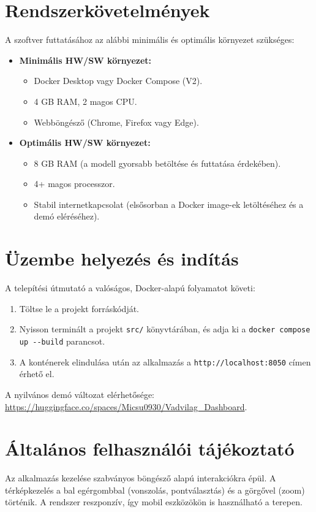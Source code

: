 \documentclass[
	parspace, %
]{elteikthesis}[2024/04/26]
\begin{document}
\section{Rendszerkövetelmények}
A szoftver futtatásához az alábbi minimális és optimális környezet szükséges:
\begin{itemize}
    \item \textbf{Minimális HW/SW környezet:}
    \begin{itemize}
        \item Docker Desktop vagy Docker Compose (V2).
        \item 4 GB RAM, 2 magos CPU.
        \item Webböngésző (Chrome, Firefox vagy Edge).
    \end{itemize}
    \item \textbf{Optimális HW/SW környezet:}
    \begin{itemize}
        \item 8 GB RAM (a modell gyorsabb betöltése és futtatása érdekében).
        \item 4+ magos processzor.
        \item Stabil internetkapcsolat (elsősorban a Docker image-ek letöltéséhez és a demó eléréséhez).
    \end{itemize}
\end{itemize}

\section{Üzembe helyezés és indítás}
A telepítési útmutató a valóságos, Docker-alapú folyamatot követi:
\begin{enumerate}
    \item Töltse le a projekt forráskódját.
    \item Nyisson terminált a projekt \texttt{src/} könyvtárában, és adja ki a \texttt{docker compose up -{}-build} parancsot.
    \item A konténerek elindulása után az alkalmazás a \texttt{http://localhost:8050} címen érhető el.
\end{enumerate}
A nyilvános demó változat elérhetősége: \url{https://huggingface.co/spaces/Micsu0930/Vadvilag_Dashboard}.

\section{Általános felhasználói tájékoztató}
Az alkalmazás kezelése szabványos böngésző alapú interakciókra épül. A térképkezelés a bal egérgombbal (vonszolás, pontválasztás) és a görgővel (zoom) történik. A rendszer reszponzív, így mobil eszközökön is használható a terepen.
\end{document}
